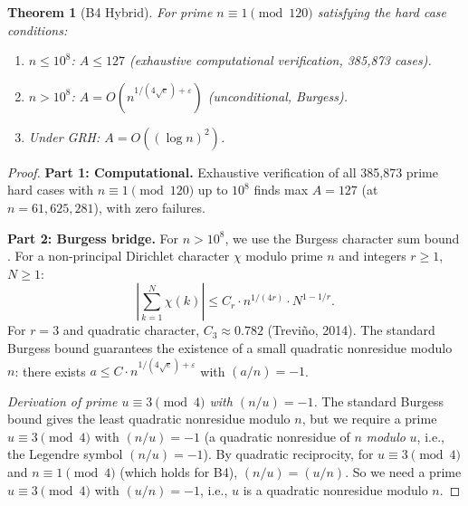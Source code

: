 \documentclass[11pt,a4paper]{article}
\theoremstyle{plain}
\newtheorem{theorem}{Theorem}[section]
\theoremstyle{plain}
\theoremstyle{definition}
\numberwithin{equation}{section}
\begin{document}
\begin{theorem}[B4 Hybrid]\label{thm:b4}
For prime $n \equiv 1 \pmod{120}$ satisfying the hard case conditions:
\begin{enumerate}[noitemsep]
  \item $n \leq 10^8$: $A \leq 127$ (exhaustive computational verification, 385,873 cases).
  \item $n > 10^8$: $A = O(n^{1/(4\sqrt{e})+\varepsilon})$ (unconditional, Burgess).
  \item Under GRH: $A = O((\log n)^2)$.
\end{enumerate}
\end{theorem}

\begin{proof}
\textbf{Part 1: Computational.} Exhaustive verification of all 385,873 prime hard cases with $n \equiv 1 \pmod{120}$ up to $10^8$ finds max $A = 127$ (at $n = 61{,}625{,}281$), with zero failures.

\textbf{Part 2: Burgess bridge.} For $n > 10^8$, we use the Burgess character sum bound \cite{Burgess1963, Trevino2014}. For a non-principal Dirichlet character $\chi$ modulo prime $n$ and integers $r \geq 1$, $N \geq 1$:
\begin{equation}
\left|\sum_{k=1}^{N} \chi(k)\right| \leq C_r \cdot n^{1/(4r)} \cdot N^{1-1/r}.
\end{equation}
For $r = 3$ and quadratic character, $C_3 \approx 0.782$ (Trevi\~no, 2014). The standard Burgess bound guarantees the existence of a small quadratic nonresidue modulo $n$: there exists $a \leq C \cdot n^{1/(4\sqrt{e})+\varepsilon}$ with $(a/n) = -1$.

\emph{Derivation of prime $u \equiv 3 \pmod{4}$ with $(n/u) = -1$.} The standard Burgess bound gives the least quadratic nonresidue modulo $n$, but we require a prime $u \equiv 3 \pmod{4}$ with $(n/u) = -1$ (a quadratic nonresidue of $n$ \emph{modulo} $u$, i.e., the Legendre symbol $(n/u) = -1$). By quadratic reciprocity, for $u \equiv 3 \pmod{4}$ and $n \equiv 1 \pmod{4}$ (which holds for B4), $(n/u) = (u/n)$. So we need a prime $u \equiv 3 \pmod{4}$ with $(u/n) = -1$, i.e., $u$ is a quadratic nonresidue modulo $n$.


\end{proof}
\end{document}
